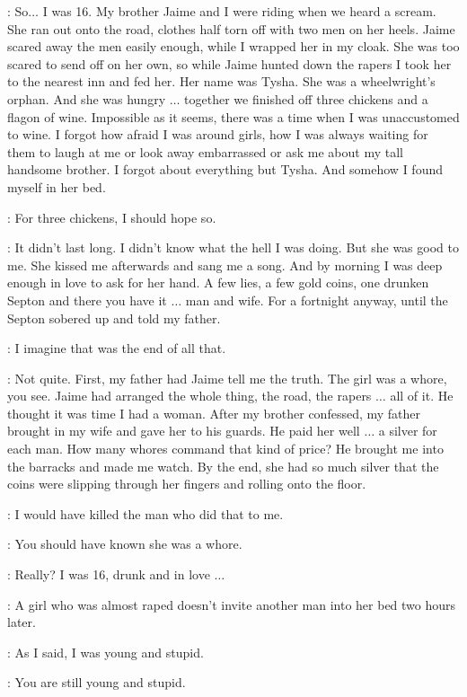 \TYRION: So$\ldots$ I was 16. My brother Jaime and I were riding when we heard a scream. She ran out onto the road, clothes half torn off with two men on her heels. Jaime scared away the men easily enough, while I wrapped her in my cloak. She was too scared to send off on her own, so while Jaime hunted down the rapers I took her to the nearest inn and fed her. Her name was Tysha. She was a wheelwright's orphan. And she was hungry $\ldots$ together we finished off three chickens and a flagon of wine. Impossible as it seems, there was a time when I was unaccustomed to wine. I forgot how afraid I was around girls, how I was always waiting for them to laugh at me or look away embarrassed or ask me about my tall handsome brother. I forgot about everything but Tysha. And somehow I found myself in her bed. 

\BRONN: For three chickens, I should hope so. 

\TYRION: It didn't last long. I didn't know what the hell I was doing. But she was good to me. She kissed me afterwards and sang me a song. And by morning I was deep enough in love to ask for her hand. A few lies, a few gold coins, one drunken Septon and there you have it $\ldots$ man and wife. For a fortnight anyway, until the Septon sobered up and told my father. 

\BRONN: I imagine that was the end of all that. 

\TYRION: Not quite. First, my father had Jaime tell me the truth. The girl was a whore, you see. Jaime had arranged the whole thing, the road, the rapers $\ldots$ all of it. He thought it was time I had a woman. After my brother confessed, my father brought in my wife and gave her to his guards. He paid her well $\ldots$  a silver for each man. How many whores command that kind of price? He brought me into the barracks and made me watch. By the end, she had so much silver that the coins were slipping through her fingers and rolling onto the floor. 

\BRONN: I would have killed the man who did that to me. 

\SHAE: You should have known she was a whore. 

\TYRION: Really? I was 16, drunk and in love $\ldots$  

\SHAE: A girl who was almost raped doesn't invite another man into her bed two hours later. 

\TYRION: As I said, I was young and stupid. 

\SHAE: You are still young and stupid. 


